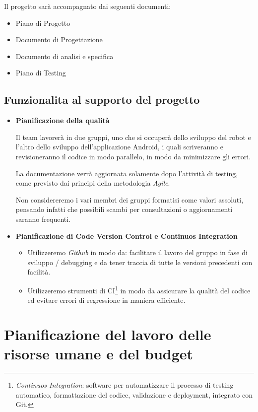 \documentclass{article}
\begin{document}
Il progetto sarà accompagnato dai seguenti documenti:

\begin{itemize}
\item
Piano di Progetto
\item
Documento di Progettazione
\item
Documento di analisi e specifica
\item
Piano di Testing
\end{itemize}

\subsection{Funzionalita al supporto del
progetto}

\begin{itemize}
\item
\textbf{Pianificazione della qualità}

 Il team lavorerà in due gruppi, uno che si occuperà dello sviluppo del robot e l'altro dello sviluppo dell'applicazione Android, i quali scriveranno e revisioneranno il codice in modo parallelo, in modo da minimizzare gli errori.

La documentazione verrà aggiornata solamente dopo l'attività di testing, come previsto dai principi della metodologia \textit{Agile}.

 Non considereremo i vari membri dei gruppi formatisi come valori assoluti, pensando infatti che possibili scambi per consultazioni o aggiornamenti saranno frequenti.
\item
\textbf{Pianificazione di Code Version Control e Continuos
Integration}

\begin{itemize}
\item
Utilizzeremo \emph{Github} in modo da: facilitare il lavoro del
gruppo in fase di sviluppo / debugging e da tener traccia di tutte
le versioni precedenti con facilità.
\item
Utilizzeremo strumenti di CI\footnote{\emph{Continuos Integration}:
software per automatizzare il processo di testing automatico,
formattazione del codice, validazione e deployment, integrato con
Git.} in modo da assicurare la qualità del codice ed evitare
errori di regressione in maniera efficiente.
\end{itemize}
\end{itemize}

\section{Pianificazione del lavoro delle risorse umane e del budget}
\end{document}

